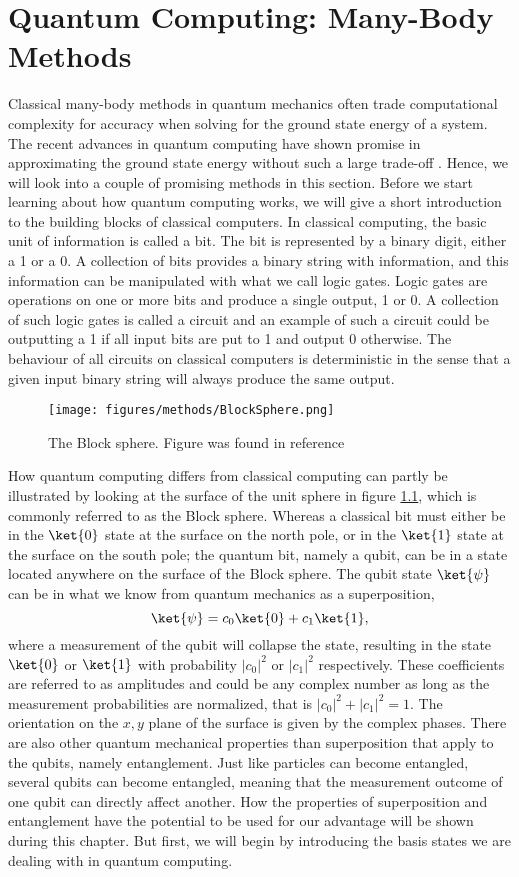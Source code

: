 \chapter{Quantum Computing: Many-Body Methods}
\label{chap:QuantumComputingMBM}
Classical many-body methods in quantum mechanics often trade computational complexity for accuracy when solving for the ground state energy of a system. The recent advances in quantum computing have shown promise in approximating the ground state energy without such a large trade-off \cite{QC1}. Hence, we will look into a couple of promising methods in this section.
Before we start learning about how quantum computing works, we will give a short introduction to the building blocks of classical computers. In classical computing, the basic unit of information is called a bit. The bit is represented by a binary digit, either a 1 or a 0. A collection of bits provides a binary string with information, and this information can be manipulated with what we call logic gates. Logic gates are operations on one or more bits and produce a single output, 1 or 0. A collection of such logic gates is called a circuit and an example of such a circuit could be outputting a 1 if all input bits are put to 1 and output 0 otherwise. The behaviour of all circuits on classical computers is deterministic in the sense that a given input binary string will always produce the same output. 

\begin{figure}[H]
    \centering
    \texttt{[image: figures/methods/BlockSphere.png]}
    \caption{The Block sphere. Figure was found in reference \cite{BlockSphere}}
    \label{fig:BlockSphere}
\end{figure}

How quantum computing differs from classical computing can partly be illustrated by looking at the surface of the unit sphere in figure \ref{fig:BlockSphere}, which is commonly referred to as the Block sphere. Whereas a classical bit must either be in the $\ket{0}$ state at the surface on the north pole, or in the $\ket{1}$ state at the surface on the south pole; the quantum bit, namely a qubit, can be in a state located anywhere on the surface of the Block sphere. The qubit state $\ket{\psi}$ can be in what we know from quantum mechanics as a superposition, 
$$ \ket{\psi} = c_0 \ket{0} + c_1 \ket{1},$$
where a measurement of the qubit will collapse the state, resulting in the state $\ket{0}$ or $\ket{1}$ with probability $|c_0|^2$ or $|c_1|^2$ respectively. These coefficients are referred to as amplitudes and could be any complex number as long as the measurement probabilities are normalized, that is $|c_0|^2 + |c_1|^2 = 1$. The orientation on the $x,y$ plane of the surface is given by the complex phases. There are also other quantum mechanical properties than superposition that apply to the qubits, namely entanglement. Just like particles can become entangled, several qubits can become entangled, meaning that the measurement outcome of one qubit can directly affect another. How the properties of superposition and entanglement have the potential to be used for our advantage will be shown during this chapter. But first, we will begin by introducing the basis states we are dealing with in quantum computing.

